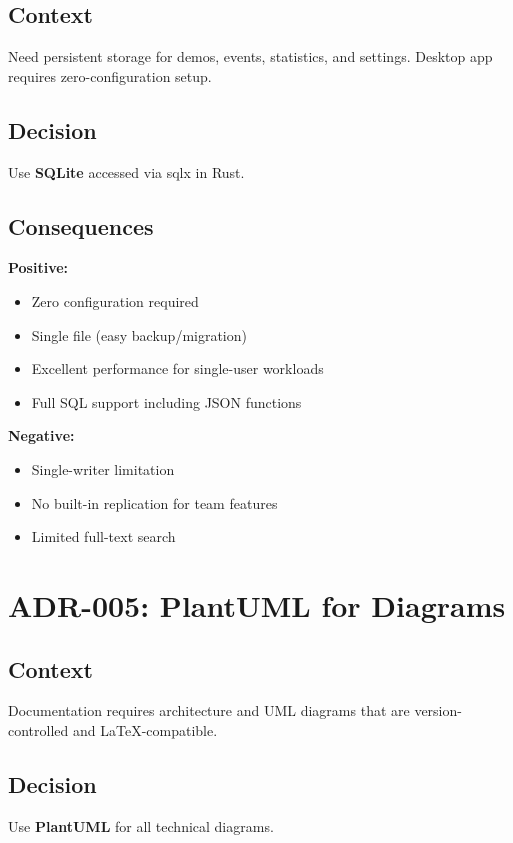 \subsection{Context}
Need persistent storage for demos, events, statistics, and settings. Desktop app requires zero-configuration setup.

\subsection{Decision}
Use \textbf{SQLite} accessed via sqlx in Rust.

\subsection{Consequences}

\textbf{Positive:}
\begin{itemize}
    \item Zero configuration required
    \item Single file (easy backup/migration)
    \item Excellent performance for single-user workloads
    \item Full SQL support including JSON functions
\end{itemize}

\textbf{Negative:}
\begin{itemize}
    \item Single-writer limitation
    \item No built-in replication for team features
    \item Limited full-text search
\end{itemize}

\section{ADR-005: PlantUML for Diagrams}

\subsection{Context}
Documentation requires architecture and UML diagrams that are version-controlled and LaTeX-compatible.

\subsection{Decision}
Use \textbf{PlantUML} for all technical diagrams.

